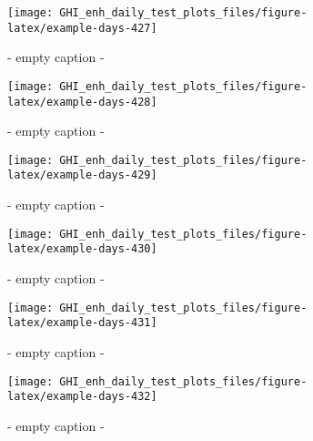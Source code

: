 \documentclass[
  10pt,
  a4paper,oneside]{article}
\begin{document}
\begin{figure}[H]

{\centering \texttt{[image: GHI\_enh\_daily\_test\_plots\_files/figure-latex/example-days-427]} 

}

\caption{ - empty caption - }\label{fig:example-days-427}
\end{figure}

\begin{figure}[H]

{\centering \texttt{[image: GHI\_enh\_daily\_test\_plots\_files/figure-latex/example-days-428]} 

}

\caption{ - empty caption - }\label{fig:example-days-428}
\end{figure}

\begin{figure}[H]

{\centering \texttt{[image: GHI\_enh\_daily\_test\_plots\_files/figure-latex/example-days-429]} 

}

\caption{ - empty caption - }\label{fig:example-days-429}
\end{figure}

\begin{figure}[H]

{\centering \texttt{[image: GHI\_enh\_daily\_test\_plots\_files/figure-latex/example-days-430]} 

}

\caption{ - empty caption - }\label{fig:example-days-430}
\end{figure}

\begin{figure}[H]

{\centering \texttt{[image: GHI\_enh\_daily\_test\_plots\_files/figure-latex/example-days-431]} 

}

\caption{ - empty caption - }\label{fig:example-days-431}
\end{figure}

\begin{figure}[H]

{\centering \texttt{[image: GHI\_enh\_daily\_test\_plots\_files/figure-latex/example-days-432]} 

}

\caption{ - empty caption - }\label{fig:example-days-432}
\end{figure}
\end{document}
